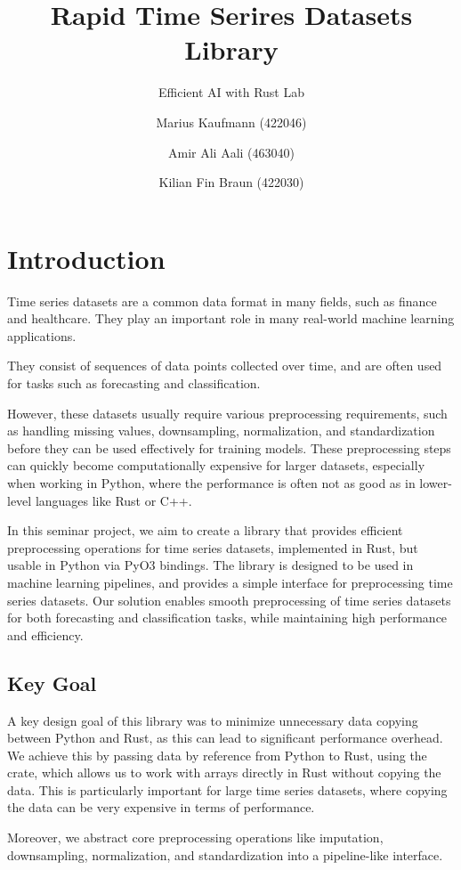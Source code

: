\documentclass[review]{AIM_report}
\title{Rapid Time Serires Datasets Library}
\subtitle{Efficient AI with Rust Lab}
\author{Marius Kaufmann (422046) \and Amir Ali Aali (463040) \and Kilian Fin Braun (422030)}
\institute{RWTH Aachen University, Germany\\
\email{$\{$amir.ali.aali, marius.kaufmann, kilian.braun$\}$@rwth-aachen.de}}
\begin{document}
\maketitle

\tableofcontents
\newpage

\section{Introduction}
\label{sec:introduction}
Time series datasets are a common data format in many fields, such as finance and healthcare. They play an important role in many real-world machine learning applications.

They consist of sequences of data points collected over time, and are often used for tasks such as forecasting and classification.

However, these datasets usually require various preprocessing requirements, such as handling missing values, downsampling, normalization, and standardization before they can be used effectively for training models. These preprocessing steps can quickly become computationally expensive for larger datasets, especially when working in Python, where the performance is often not as good as in lower-level languages like Rust or C++.

In this seminar project, we aim to create a library that provides efficient preprocessing operations for time series datasets, implemented in Rust, but usable in Python via PyO3 bindings. The library is designed to be used in machine learning pipelines, and provides a simple interface for preprocessing time series datasets. Our solution enables smooth preprocessing of time series datasets for both forecasting and classification tasks, while maintaining high performance and efficiency.

\subsection{Key Goal}
A key design goal of this library was to minimize unnecessary data copying between Python and Rust, as this can lead to significant performance overhead. We achieve this by passing data by reference from Python to Rust, using the \numpy crate, which allows us to work with \numpy arrays directly in Rust without copying the data. This is particularly important for large time series datasets, where copying the data can be very expensive in terms of performance.

Moreover, we abstract core preprocessing operations like imputation, downsampling, normalization, and standardization into a pipeline-like interface.
\end{document}
